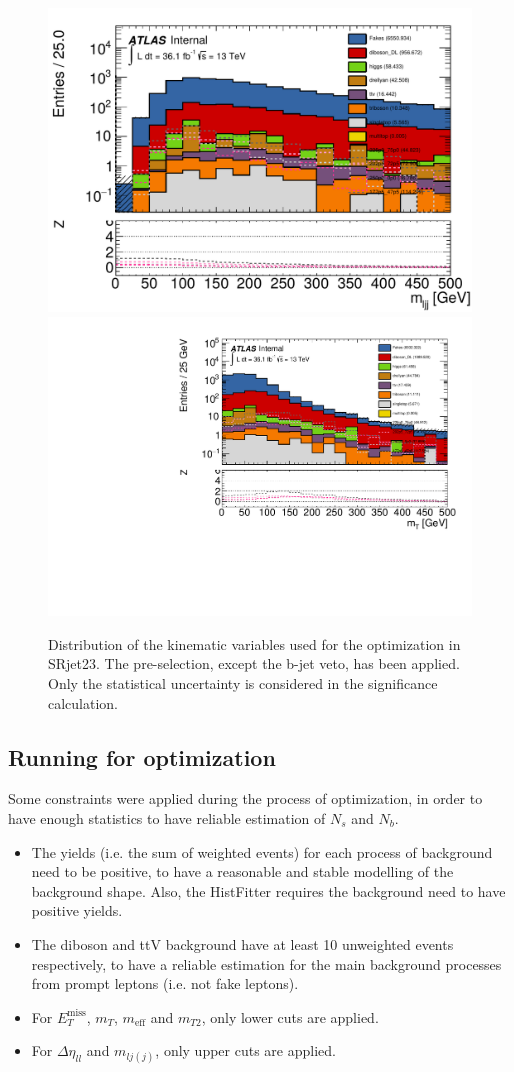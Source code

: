 \begin{figure}[htpb]
\includegraphics[width=0.45\linewidth]{data/plot/SR_redefinition/SRjet23_step0/lemljj_comb_fakes.pdf}\includegraphics[width=0.45\linewidth]{data/plot/SR_redefinition/SRjet23_step0/lemt_fakes.pdf}\\
\caption{Distribution of the kinematic variables used for the optimization in SRjet23. The pre-selection, except the b-jet veto, has been applied. Only the statistical uncertainty is considered in the significance calculation.}
\label{fig:SRjet23_pre-selection}
\end{figure}

\subsection{Running for optimization}
Some constraints were applied during the process of optimization, in order to have enough statistics to have reliable estimation of $N_s$ and $N_b$.
\begin{itemize}
\item The yields (i.e. the sum of weighted events) for each process of background need to be positive, to have a reasonable and stable modelling of the background shape.
Also, the HistFitter requires the background need to have positive yields.
\item The diboson and ttV background have at least 10 unweighted events respectively, to have a reliable estimation for the main background processes from prompt leptons (i.e. not fake leptons).
\item For $E_T^{\text{miss}}$, $m_T$, $m_{\text{eff}}$ and $m_{T2}$, only lower cuts are applied.
\item For $\Delta \eta_{ll}$ and $m_{lj(j)}$, only upper cuts are applied.
\end{itemize}

